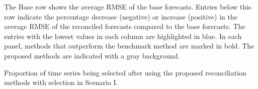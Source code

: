 \documentclass[11pt,a4paper,]{article}
\begin{document}
\begin{table}[!h]
{\begin{threeparttable}
\begin{tablenotes}[para]
\item The Base row shows the average RMSE of the base forecasts. Entries below this row indicate the percentage decrease (negative) or increase (positive) in the average RMSE of the reconciled forecasts compared to the base forecasts. The entries with the lowest values in each column are highlighted in blue. In each panel, methods that outperform the benchmark method are marked in bold. The proposed methods are indicated with a gray background.
\end{tablenotes}
\end{threeparttable}}
\end{table}

\hypertarget{tbl-s1-selection}{}
\begin{table}[!h]
\caption{\label{tbl-s1-selection}Proportion of time series being selected after using the proposed
reconciliation methods with selection in Scenario I. }\tabularnewline

\centering\begingroup\fontsize{7}{9}\selectfont


\end{table}
\end{document}
